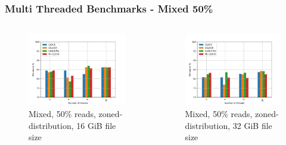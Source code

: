\documentclass[
	aspectratio=169,
	compress,
]{beamer}
\newcommand{\navframetitle}[1]{\frametitle{#1\hfill{\footnotesize\lastsection{}}}}
\begin{document}

\begin{frame}[fragile]
	\navframetitle{Multi Threaded Benchmarks - Mixed 50\%}

	\begin{columns}
		\begin{column}{0.5\textwidth}
			\begin{figure}[ht]
    			\centering
    			\includegraphics[width=\textwidth]{multi_16_gb_rw_50to50_zoned.jpg}
        		\caption{Mixed, 50\% reads, zoned-distribution, 16 GiB file size}
			\end{figure}
		\end{column}
		\begin{column}{0.5\textwidth}
			\begin{figure}[ht]
    			\centering
    			\includegraphics[width=\textwidth]{multi_32_gb_rw_50to50_zoned.jpg}
        		\caption{Mixed, 50\% reads, zoned-distribution, 32 GiB file size}
			\end{figure}			
		\end{column}
	\end{columns}
\end{frame}
\end{document}
